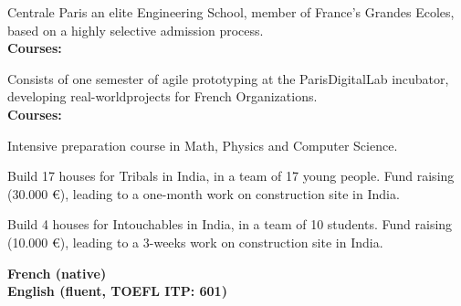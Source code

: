 



\small{Centrale Paris an elite Engineering School, member of France’s Grandes Ecoles, based on a highly selective admission process.\\}
{\textbf{Courses:}} \footnotesize{    }

\divider

\small{Consists of one semester of agile prototyping at the ParisDigitalLab incubator, developing real-worldprojects for French Organizations.\\}%
{\textbf{Courses:}} \footnotesize{  }

\divider

\small{Intensive preparation course in Math, Physics and Computer Science.}

\divider





\small{Build 17 houses for Tribals in India, in a team of 17 young people.
Fund raising (30.000 €), leading to a one-month work on construction site in India.}

\divider


\small{Build 4 houses for Intouchables in India, in a team of 10 students.
Fund raising (10.000 €), leading to a 3-weeks work on construction site in India.}


{\textcolor{emphasis}{\textbf{French (native)\\English (fluent, TOEFL ITP: 601)}}}



